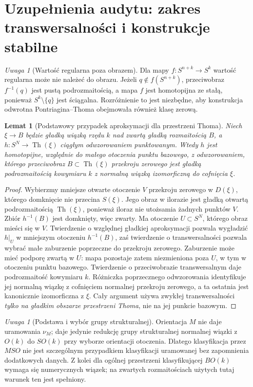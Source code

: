 \documentclass[11pt,a4paper,oneside]{report}
\theoremstyle{plain}
\newtheorem{lemat}[twierdzenie]{Lemat}
\theoremstyle{definition}
\theoremstyle{remark}
\newtheorem{uwaga}[twierdzenie]{Uwaga}
\begin{document}
\section{Uzupełnienia audytu: zakres transwersalności i konstrukcje stabilne}
\begin{uwaga}[Wartość regularna poza obrazem]
Dla mapy $f:S^{n+k}\to S^k$ wartość regularna może nie należeć
do obrazu. Jeżeli $q\notin f(S^{n+k})$, przeciwobraz $f^{-1}(q)$
jest pustą podrozmaitością, a mapa $f$ jest homotopijna ze stałą,
ponieważ $S^k\setminus\{q\}$ jest ściągalna. Rozróżnienie
to jest niezbędne, aby konstrukcja odwrotna Pontriagina--Thoma
obejmowała również klasę zerową.
\end{uwaga}

\begin{lemat}[Podstawowy przypadek aproksymacji dla przestrzeni Thoma]
\label{lem:thom-transversal-v9-audyt}
Niech $\xi\to B$ będzie gładką wiązką rzędu $k$ nad zwartą
gładką rozmaitością $B$, a $h:S^N\to\operatorname{Th}(\xi)$
ciągłym odwzorowaniem punktowanym. Wtedy $h$ jest
homotopijne, względnie do małego otoczenia punktu bazowego,
z odwzorowaniem, którego przeciwobraz $B\subset\operatorname{Th}(\xi)$
przekroju zerowego jest gładką podrozmaitością
kowymiaru $k$ z normalną wiązką izomorficzną do
cofnięcia $\xi$.
\end{lemat}
\begin{proof}
Wybierzmy mniejsze otwarte otoczenie $V$ przekroju zerowego
w $D(\xi)$, którego domknięcie nie przecina $S(\xi)$.
Jego obraz w ilorazie jest gładką otwartą podrozmaitością
$\operatorname{Th}(\xi)$, ponieważ iloraz nie utożsamia
żadnych punktów $V$. Zbiór $h^{-1}(B)$ jest domknięty,
więc zwarty. Ma otoczenie $U\subset S^N$, którego
obraz mieści się w $V$. Twierdzenie o względnej gładkiej
aproksymacji pozwala wygładzić $h|_U$ w mniejszym
otoczeniu $h^{-1}(B)$, zaś twierdzenie o transwersalności
pozwala wybrać małe zaburzenie poprzeczne do przekroju
zerowego. Zaburzenie może mieć podporę zwartą w $U$:
mapa pozostaje zatem niezmieniona poza $U$, w tym
w otoczeniu punktu bazowego. Twierdzenie o przeciwobrazie
transwersalnym daje podrozmaitość kowymiaru $k$.
Różniczka poprzecznego odwzorowania identyfikuje jej
normalną wiązkę z cofnięciem normalnej przekroju
zerowego, a ta ostatnia jest kanonicznie izomorficzna
z $\xi$. Cały argument używa zwykłej transwersalności
\emph{tylko na gładkim obszarze przestrzeni Thoma},
nie na jej punkcie bazowym.
\end{proof}

\begin{uwaga}[Podstawa i wybór grupy strukturalnej]
Orientacja $M$ nie daje uramowania $\nu_M$;
daje jedynie redukcję grupy strukturalnej normalnej
wiązki z $O(k)$ do $SO(k)$ przy wyborze orientacji otoczenia.
Dlatego klasyfikacja przez $MSO$ nie jest szczególnym
przypadkiem klasyfikacji uramowanej bez zapomnienia
dodatkowych danych. Z kolei dla ogólnej przestrzeni
klasyfikującej $BO(k)$ wymaga się numerycznych wiązek;
na zwartych rozmaitościach użytych tutaj warunek ten
jest spełniony.
\end{uwaga}
\end{document}

